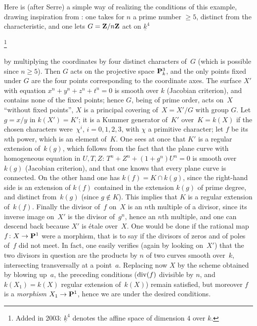 Here is (after Serre) a simple way of realizing the
conditions of this example, drawing inspiration from \cite[]{XI.5}: one takes
for $n$ a prime number $\geq 5$, distinct from the
characteristic, and one lets $G=\mathbf{Z}/n\mathbf{Z}$ act on
$\underline{k}^4$%
{{\renewcommand{\thefootnote}{*}\addtocounter{footnote}{-1}\kern1pt\footnote{\lcrochetbf Added in 2003: $\underline{k}^4$ denotes the affine space of dimension $4$ over $k$.\rcrochetbf}}}
by multiplying the coordinates by four distinct
characters of~$G$ (which is possible since $n\geq
5$). Then $G$ acts on the projective space $\mathbf{P}^3_k$, and the
only points fixed under $G$ are the four points corresponding to the
coordinate axes. The surface $X'$ with equation
$x^n+y^n+z^n+t^n=0$
is smooth over
$k$ (Jacobian criterion), and contains none of the fixed points;
hence $G$, being of prime order, acts on~$X$ ``without fixed
points'', \ie $X$ is a principal covering of~$X=X'/G$ with group
$G$. Let $g=x/y$ in $k(X')=K'$; it is a Kummer
generator of~$K'$ over~$K=k(X)$ if the chosen characters
were~$\chi^i$, $i=0,1,2,3$, with $\chi$ a primitive
character; let $f$ be its $n$th power, which is an
element of~$K$. One sees at once that $K'$ is a
regular extension of~$k(g)$, which follows from the fact that
the plane curve with homogeneous equation in $U,T,Z$:
$T^n+Z^n+(1+g^n)U^n=0$ is smooth over~$k(g)$ (Jacobian criterion), and
that one knows that every plane curve is connected. On the other hand one has
$k(f)=K\cap k(g)$, since the right-hand side is an extension of
$k(f)$ contained in the extension $k(g)$ of prime degree, and
distinct from~$k(g)$ (since $g\not\in K$). This implies that $K$ is
a regular extension of~$k(f)$. Finally the divisor of~$f$
on~$X$ is an $n$th multiple of a divisor, since its
inverse image on~$X'$ is the divisor of~$g^n$, hence an $n$th
multiple, and one can descend back because $X'$ is \'etale over~$X$. One would be done if the rational map $f\colon X\to \PP^1$
were a morphism, that is to say if the divisors of
zeros and of poles of~$f$ did not meet. In fact,
one easily verifies (again by looking on~$X'$) that the
two divisors in question are the products by $n$ of two
curves smooth over~$k$, intersecting transversally at a point~$a$. Replacing now $X$ by the scheme obtained by blowing up~$a$, the preceding conditions ($\operatorname{\mathrm{div}}(f)$ divisible by
$n$, and $k(X_1)=k(X)$ regular extension of~$k(X)$) remain
satisfied, but moreover $f$ is a \emph{morphism} $X_1\to
\PP^1$, hence we are under the desired conditions.
